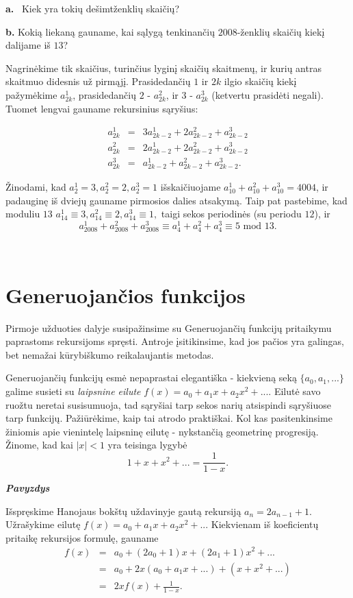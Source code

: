 \begin{enumerate}
{{\bf a.} \ Kiek yra tokių dešimtženklių skaičių?

{\bf b.} Kokią liekaną gauname, kai sąlygą tenkinančių $2008$-ženklių skaičių kiekį dalijame iš $13$?}

Nagrinėkime tik skaičius, turinčius lyginį skaičių skaitmenų, ir kurių antras skaitmuo didesnis už pirmąjį. Prasidedančių $1$ ir $2k$ ilgio skaičių kiekį pažymėkime $a_{2k}^1$, prasidedančių $2$ - $a_{2k}^2$, ir $3$ - $a_{2k}^3$ (ketvertu prasidėti negali). Tuomet lengvai gauname rekursinius sąryšius:

\begin{eqnarray*}
a_{2k}^1 &=& 3a_{2k-2}^1 +2a_{2k-2}^2 + a_{2k-2}^3 \\ a_{2k}^2 &=& 2a_{2k-2}^1 +2a_{2k-2}^2 + a_{2k-2}^3 \\ a_{2k}^3 &=& a_{2k-2}^1 +a_{2k-2}^2 + a_{2k-2}^3. 
\end{eqnarray*}

Žinodami, kad $a_{2}^1 = 3, a_{2}^2 = 2, a_{2}^3 = 1$ išskaičiuojame $a_{10}^1 + a_{10}^2 + a_{10}^3 = 4004$, ir padauginę iš dviejų gauname pirmosios dalies atsakymą. Taip pat pastebime, kad moduliu $13$ $a_{14}^1 \equiv 3, a_{14}^2 \equiv 2, a_{14}^3 \equiv 1,$ taigi sekos periodinės (su periodu $12$), ir $$a_{2008}^1 + a_{2008}^2 + a_{2008}^3 \equiv a_{4}^1 + a_{4}^2 + a_{4}^3 \equiv 5 \text{ mod } 13.$$ 

\end{enumerate}  
\
\section{Generuojančios funkcijos}

Pirmoje užduoties dalyje susipažinsime su Generuojančių funkcijų pritaikymu paprastoms rekursijoms spręsti. Antroje įsitikinsime, kad jos pačios yra galingas, bet nemažai kūrybiškumo reikalaujantis metodas. 

Generuojančių funkcijų esmė nepaprastai elegantiška - kiekvieną seką $\{a_0, a_1, ...\}$ galime susieti su {\itshape laipsnine eilute} $f(x) = a_0 + a_1x + a_2x^2 + ...$. Eilutė savo ruožtu neretai susisumuoja, tad sąryšiai tarp sekos narių atsispindi sąryšiuose tarp funkcijų. Pažiūrėkime, kaip tai atrodo praktiškai. Kol kas pasitenkinsime žiniomis apie vienintelę laipsninę eilutę - nykstančią geometrinę progresiją. Žinome, kad kai $|x|<1$ yra teisinga lygybė $$1 + x + x^2 + ... = \frac{1}{1-x}.$$ 

{\bf \itshape Pavyzdys} 

Išspręskime Hanojaus bokštų uždavinyje gautą rekursiją $a_n = 2a_{n-1} + 1$. 
Užrašykime eilutę $f(x) = a_0 + a_1x + a_2x^2 + ...$ Kiekvienam iš koeficientų pritaikę rekursijos formulę, gauname \begin{eqnarray*}f(x) &=& a_0 + (2a_0 + 1)x + (2a_1 + 1)x^2 + ... \\&=& a_0 + 2x(a_0 + a_1x + ...) + (x + x^2 + ...) \\&=& 2xf(x) + \frac{1}{1-x}.\end{eqnarray*}

